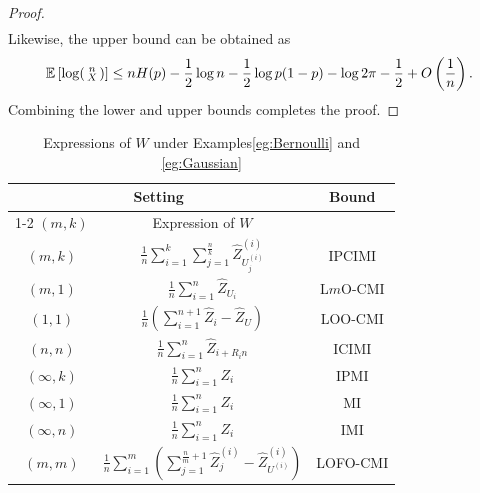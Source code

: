 \documentclass[onecolumn,romanappendices,10pt]{IEEEtran}
\newcommand{\EE}{{\mathbb{E}}}
\begin{document}
\begin{proof}
\begin{equation}
\begin{aligned}
			\end{aligned}
		\end{equation}
		Likewise, the upper bound can be obtained as
		\begin{equation}
			\begin{aligned}
				\EE \left[ \log \begin{psmallmatrix} n \\ X \end{psmallmatrix} \right] \leq n H(p) - \frac{1}{2} \log n - \frac{1}{2} \log p (1 - p) - \log 2\pi - \frac{1}{2} + O \left( \frac{1}{n} \right).
			\end{aligned}
		\end{equation}
		Combining the lower and upper bounds completes the proof.	
	\end{proof}
	
	\begin{table}[t]
		\centering
		\caption{Expressions of $W$ under Examples\ref{eg:Bernoulli} and \ref{eg:Gaussian}}
		\begin{threeparttable}
			\begin{tabular}{|c|c|c|} \hline
				\multicolumn{2}{|c|}{Setting} & \multirow{2}{*}{Bound} \\ \cline{1-2}
				$(m, k)$ & Expression of $W$ & \\ \hline\hline
				$(m, k)$ & $\frac{1}{n} \sum_{i=1}^{k} \sum_{j=1}^{\frac{n}{k}} \hat{Z}^{(i)}_{U^{(i)}_j}$ & IPCIMI \\ \hline
				$(m, 1)$ & $\frac{1}{n} \sum_{i=1}^{n} \hat{Z}_{U_i}$ & L$m$O-CMI \\ \hline
				$(1, 1)$ & $\frac{1}{n} \left( \sum_{i=1}^{n+1} \hat{Z}_i - \hat{Z}_U \right)$ & LOO-CMI \cite{rammal2022leave} \\ \hline
				$(n, n)$ & $\frac{1}{n} \sum_{i=1}^{n} \hat{Z}_{i + R_i n}$ & ICIMI \cite{zhou2022individually} \\ \hline
				$(\infty, k)$ & $\frac{1}{n} \sum_{i=1}^{n} Z_i$ & IPMI \\ \hline
				$(\infty, 1)$ & $\frac{1}{n} \sum_{i=1}^{n} Z_i$ & MI \cite{xu2017information} \\ \hline
				$(\infty, n)$ & $\frac{1}{n} \sum_{i=1}^{n} Z_i$ & IMI \cite{bu2020tightening} \\ \hline
				$(m, m)$ & $\frac{1}{n} \sum_{i=1}^{m} \left( \sum_{j=1}^{\frac{n}{m} + 1} \hat{Z}^{(i)}_j - \hat{Z}^{(i)}_{U^{(i)}} \right)$ & LOFO-CMI \\ \hline
			\end{tabular} 
		\end{threeparttable} 
		\label{tab:expression_W}
	\end{table}
	
\end{document}
